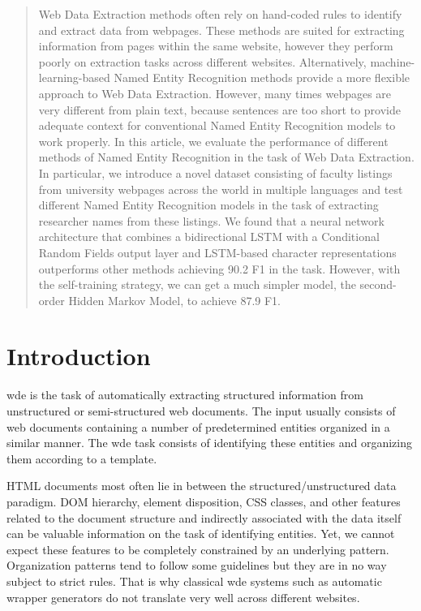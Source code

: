 \documentclass{nle}
\begin{document}
\begin{abstract}
Web Data Extraction methods often rely on hand-coded rules to 
identify and extract data from webpages. These methods are
suited for extracting information from pages within
the same website, however they perform poorly on extraction 
tasks across different websites. Alternatively, 
machine-learning-based Named Entity Recognition methods provide a more flexible 
approach to Web Data Extraction. However, many times webpages are very different 
from plain text, because sentences are too short to provide adequate 
context for conventional Named Entity Recognition models to work 
properly. 
In this article, we 
evaluate the performance of different methods of Named Entity Recognition
in the task of Web Data Extraction. In particular, we introduce a novel 
dataset consisting of faculty listings from university webpages across
the world in multiple languages and test different Named Entity Recognition 
models in the task of 
extracting researcher names from these listings. We found that a 
neural network architecture that combines a bidirectional LSTM with
a Conditional Random Fields output layer and LSTM-based character 
representations outperforms other methods achieving 90.2 F1 in 
the task. However, with the self-training strategy, we can get a much simpler 
model, the second-order Hidden Markov Model, to achieve 87.9 F1.

\end{abstract}

\section{Introduction}

\gls{wde} is the task of automatically extracting structured 
information from unstructured or semi-structured web documents. The input 
usually consists of web documents containing a number of predetermined entities 
organized in a similar manner. The \gls{wde} task consists of 
identifying these entities and organizing them according to a template. 

HTML documents most often lie in between the structured/unstructured 
data paradigm. DOM hierarchy, element disposition, CSS classes, and other 
features related to the document structure and indirectly associated with the 
data itself can be valuable information on the task of identifying
entities. Yet, we cannot expect these features to be completely constrained 
by an underlying pattern. Organization patterns tend to follow some guidelines 
but they are in no way subject to strict rules. That is why classical \gls{wde} 
systems such as automatic wrapper generators 
\cite{Kushmerick2000,Hsu1998,Muslea1999}
do not translate very well across different websites. 
\end{document}
